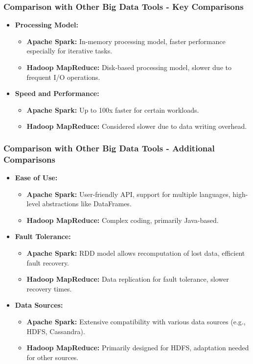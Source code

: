 \documentclass[aspectratio=169]{beamer}
\begin{document}
\begin{frame}[fragile]
    \frametitle{Comparison with Other Big Data Tools - Key Comparisons}
    \begin{itemize}
        \item \textbf{Processing Model:}
        \begin{itemize}
            \item \textbf{Apache Spark:} In-memory processing model, faster performance especially for iterative tasks.
            \item \textbf{Hadoop MapReduce:} Disk-based processing model, slower due to frequent I/O operations.
        \end{itemize}
        \item \textbf{Speed and Performance:}
        \begin{itemize}
            \item \textbf{Apache Spark:} Up to 100x faster for certain workloads.
            \item \textbf{Hadoop MapReduce:} Considered slower due to data writing overhead.
        \end{itemize}
    \end{itemize}
\end{frame}

\begin{frame}[fragile]
    \frametitle{Comparison with Other Big Data Tools - Additional Comparisons}
    \begin{itemize}
        \item \textbf{Ease of Use:}
        \begin{itemize}
            \item \textbf{Apache Spark:} User-friendly API, support for multiple languages, high-level abstractions like DataFrames.
            \item \textbf{Hadoop MapReduce:} Complex coding, primarily Java-based.
        \end{itemize}
        \item \textbf{Fault Tolerance:}
        \begin{itemize}
            \item \textbf{Apache Spark:} RDD model allows recomputation of lost data, efficient fault recovery.
            \item \textbf{Hadoop MapReduce:} Data replication for fault tolerance, slower recovery times.
        \end{itemize}
        \item \textbf{Data Sources:}
        \begin{itemize}
            \item \textbf{Apache Spark:} Extensive compatibility with various data sources (e.g., HDFS, Cassandra).
            \item \textbf{Hadoop MapReduce:} Primarily designed for HDFS, adaptation needed for other sources.
        \end{itemize}
    \end{itemize}
\end{frame}
\end{document}
